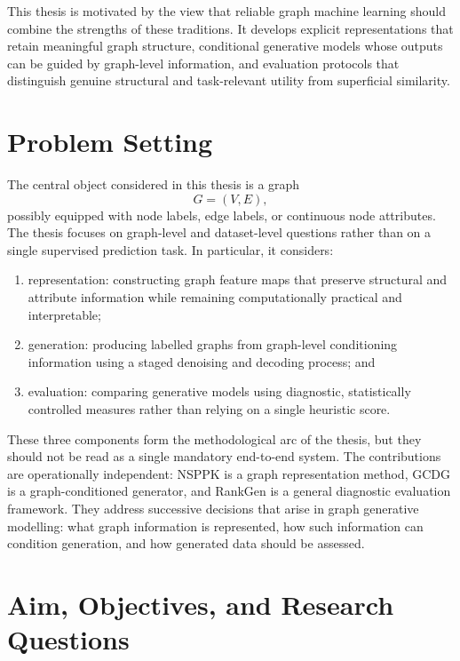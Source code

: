 This thesis is motivated by the view that reliable graph machine learning should combine the strengths of these traditions. It develops explicit representations that retain meaningful graph structure, conditional generative models whose outputs can be guided by graph-level information, and evaluation protocols that distinguish genuine structural and task-relevant utility from superficial similarity.


\section{Problem Setting}
\label{sec:intro:problem}

The central object considered in this thesis is a graph
\[
    G=(V,E),
\]
possibly equipped with node labels, edge labels, or continuous node attributes.
The thesis focuses on graph-level and dataset-level questions rather than on a
single supervised prediction task. In particular, it considers:

\begin{enumerate}[label=(\roman*)]
    \item representation: constructing graph feature maps that preserve
    structural and attribute information while remaining computationally
    practical and interpretable;
    \item generation: producing labelled graphs from graph-level conditioning
    information using a staged denoising and decoding process; and
    \item evaluation: comparing generative models using diagnostic,
    statistically controlled measures rather than relying on a single heuristic
    score.
\end{enumerate}

These three components form the methodological arc of the thesis, but they
should not be read as a single mandatory end-to-end system. The contributions
are operationally independent: NSPPK is a graph representation method, GCDG is
a graph-conditioned generator, and RankGen is a general diagnostic evaluation
framework. They address successive decisions that arise in graph generative
modelling: what graph information is represented, how such information can
condition generation, and how generated data should be assessed.

\section{Aim, Objectives, and Research Questions}
\label{sec:intro:questions}

